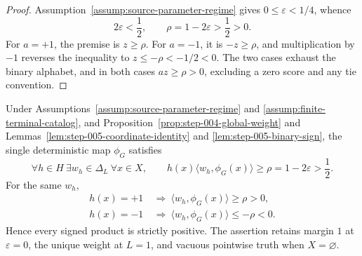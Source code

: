 \begin{proof}
Assumption~\ref{assump:source-parameter-regime} gives
$0\le\varepsilon<1/4$, whence
\[
2\varepsilon<\frac12,
\qquad \rho=1-2\varepsilon>\frac12>0.
\]
For $a=+1$, the premise is $z\ge\rho$.  For $a=-1$, it is
$-z\ge\rho$, and multiplication by $-1$ reverses the inequality to
$z\le-\rho<-1/2<0$.  The two cases exhaust the binary alphabet, and in
both cases $az\ge\rho>0$, excluding a zero score and any tie convention.
\end{proof}

\begin{proposition}
\label{prop:step-005-exact-representation}
Under Assumptions~\ref{assump:source-parameter-regime} and
\ref{assump:finite-terminal-catalog}, and
Proposition~\ref{prop:step-004-global-weight} and
Lemmas~\ref{lem:step-005-coordinate-identity} and
\ref{lem:step-005-binary-sign}, the single deterministic map $\phi_G$
satisfies
\begin{equation}\label{eq:exact-common-map-margin}
\forall h\in H\ \exists w_h\in\Delta_L\ \forall x\in X,\qquad
h(x)\langle w_h,\phi_G(x)\rangle
\ge\rho=1-2\varepsilon>\frac12.
\end{equation}
For the same $w_h$,
\begin{align*}
h(x)=+1&\ \Longrightarrow\
\langle w_h,\phi_G(x)\rangle\ge\rho>0,\\
h(x)=-1&\ \Longrightarrow\
\langle w_h,\phi_G(x)\rangle\le-\rho<0.
\end{align*}
Hence every signed product is strictly positive.  The assertion retains
margin $1$ at $\varepsilon=0$, the unique weight at $L=1$, and vacuous
pointwise truth when $X=\varnothing$.
\end{proposition}

